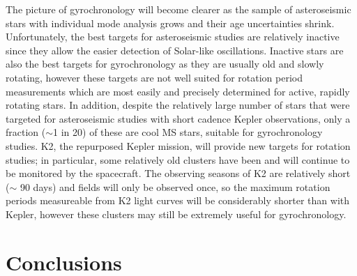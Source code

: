 \documentclass[10pt,preprint]{aastex}
\begin{document}
The picture of gyrochronology will become clearer as the sample of asteroseismic stars with individual mode analysis grows and their age uncertainties shrink.
Unfortunately, the best targets for asteroseismic studies are relatively inactive since they allow the easier detection of Solar-like oscillations.
Inactive stars are also the best targets for gyrochronology as they are usually old and slowly rotating, however these targets are not well suited for rotation period measurements which are most easily and precisely determined for active, rapidly rotating stars.
In addition, despite the relatively large number of stars that were targeted for asteroseismic studies with short cadence Kepler observations, only a fraction ($\sim$1 in 20) of these are cool MS stars, suitable for gyrochronology studies.
K2, the repurposed Kepler mission, will provide new targets for rotation studies; in particular, some relatively old clusters have been and will continue to be monitored by the spacecraft.
The observing seasons of K2 are relatively short ($\sim$ 90 days) and fields will only be observed once, so the maximum rotation periods measureable from K2 light curves will be considerably shorter than with Kepler, however these clusters may still be extremely useful for gyrochronology.

\section{Conclusions}
\label{sec:conclusions}
\end{document}
